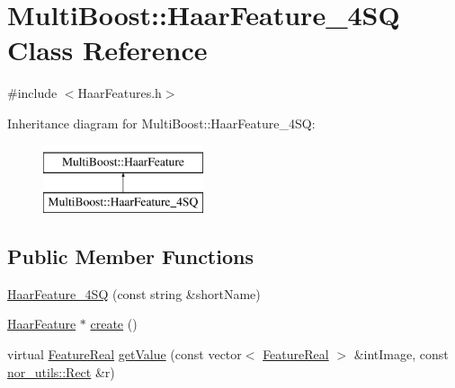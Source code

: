\hypertarget{classMultiBoost_1_1HaarFeature__4SQ}{
\section{MultiBoost::HaarFeature\_\-4SQ Class Reference}
\label{classMultiBoost_1_1HaarFeature__4SQ}
}


{\ttfamily \#include $<$HaarFeatures.h$>$}

Inheritance diagram for MultiBoost::HaarFeature\_\-4SQ:\begin{figure}[H]
\begin{center}
\leavevmode
\includegraphics[height=2.000000cm]{classMultiBoost_1_1HaarFeature__4SQ}
\end{center}
\end{figure}
\subsection*{Public Member Functions}
\begin{DoxyCompactItemize}
\item 
\hyperlink{classMultiBoost_1_1HaarFeature__4SQ_a5e44aaa3b514cea4d0e95ecfc9b21607}{HaarFeature\_\-4SQ} (const string \&shortName)
\item 
\hyperlink{classMultiBoost_1_1HaarFeature}{HaarFeature} $\ast$ \hyperlink{classMultiBoost_1_1HaarFeature__4SQ_ab9e2a96a39586c572ddced5c716f0501}{create} ()
\item 
virtual \hyperlink{Defaults_8h_a3a11cfe6a5d469d921716ca6291e934f}{FeatureReal} \hyperlink{classMultiBoost_1_1HaarFeature__4SQ_a04fec1cfc001d643dc4be6e0d415b0d1}{getValue} (const vector$<$ \hyperlink{Defaults_8h_a3a11cfe6a5d469d921716ca6291e934f}{FeatureReal} $>$ \&intImage, const \hyperlink{structnor__utils_1_1Rect}{nor\_\-utils::Rect} \&r)
\end{DoxyCompactItemize}



